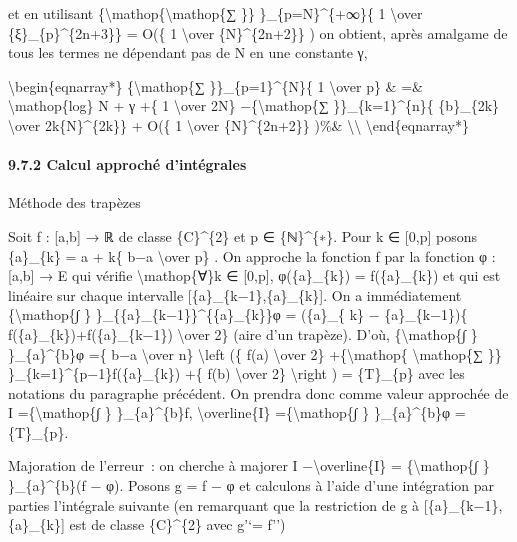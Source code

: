 \documentclass[]{article}
\begin{document}
et en utilisant \{\textbackslash{}mathop\{\textbackslash{}mathop\{∑ \}\}
\}\_\{p=N\}\^{}\{+∞\}\{ 1 \textbackslash{}over
\{ξ\}\_\{p\}\^{}\{2n+3\}\} = O(\{ 1 \textbackslash{}over
\{N\}\^{}\{2n+2\}\} ) on obtient, après amalgame de tous les termes ne
dépendant pas de N en une constante γ,

\textbackslash{}begin\{eqnarray*\} \{\textbackslash{}mathop\{∑
\}\}\_\{p=1\}\^{}\{N\}\{ 1 \textbackslash{}over p\} \& =\&
\textbackslash{}mathop\{log\} N + γ +\{ 1 \textbackslash{}over 2N\}
−\{\textbackslash{}mathop\{∑ \}\}\_\{k=1\}\^{}\{n\}\{ \{b\}\_\{2k\}
\textbackslash{}over 2k\{N\}\^{}\{2k\}\} + O(\{ 1 \textbackslash{}over
\{N\}\^{}\{2n+2\}\} )\%\& \textbackslash{}\textbackslash{}
\textbackslash{}end\{eqnarray*\}

\paragraph{9.7.2 Calcul approché d'intégrales}

Méthode des trapèzes

Soit f : {[}a,b{]} → ℝ de classe \{C\}\^{}\{2\} et p ∈ \{ℕ\}\^{}\{∗\}.
Pour k ∈ {[}0,p{]} posons \{a\}\_\{k\} = a + k\{ b−a
\textbackslash{}over p\} . On approche la fonction f par la fonction φ :
{[}a,b{]} → E qui vérifie \textbackslash{}mathop\{∀\}k ∈ {[}0,p{]},
φ(\{a\}\_\{k\}) = f(\{a\}\_\{k\}) et qui est linéaire sur chaque
intervalle {[}\{a\}\_\{k−1\},\{a\}\_\{k\}{]}. On a immédiatement
\{\textbackslash{}mathop\{∫ \}
\}\_\{\{a\}\_\{k−1\}\}\^{}\{\{a\}\_\{k\}\}φ = (\{a\}\_\{ k\} −
\{a\}\_\{k−1\})\{ f(\{a\}\_\{k\})+f(\{a\}\_\{k−1\}) \textbackslash{}over
2\} (aire d'un trapèze). D'où, \{\textbackslash{}mathop\{∫ \}
\}\_\{a\}\^{}\{b\}φ =\{ b−a \textbackslash{}over n\}
\textbackslash{}left (\{ f(a) \textbackslash{}over 2\}
+\{\textbackslash{}mathop\{ \textbackslash{}mathop\{∑ \}\}
\}\_\{k=1\}\^{}\{p−1\}f(\{a\}\_\{k\}) +\{ f(b) \textbackslash{}over 2\}
\textbackslash{}right ) = \{T\}\_\{p\} avec les notations du paragraphe
précédent. On prendra donc comme valeur approchée de I
=\{\textbackslash{}mathop\{∫ \} \}\_\{a\}\^{}\{b\}f,
\textbackslash{}overline\{I\} =\{\textbackslash{}mathop\{∫ \}
\}\_\{a\}\^{}\{b\}φ = \{T\}\_\{p\}.

Majoration de l'erreur~: on cherche à majorer \textbar{}I
−\textbackslash{}overline\{I\}\textbar{} =
\textbar{}\{\textbackslash{}mathop\{∫ \} \}\_\{a\}\^{}\{b\}(f −
φ)\textbar{}. Posons g = f − φ et calculons à l'aide d'une intégration
par parties l'intégrale suivante (en remarquant que la restriction de g
à {[}\{a\}\_\{k−1\},\{a\}\_\{k\}{]} est de classe \{C\}\^{}\{2\} avec
g'`= f'')
\end{document}
